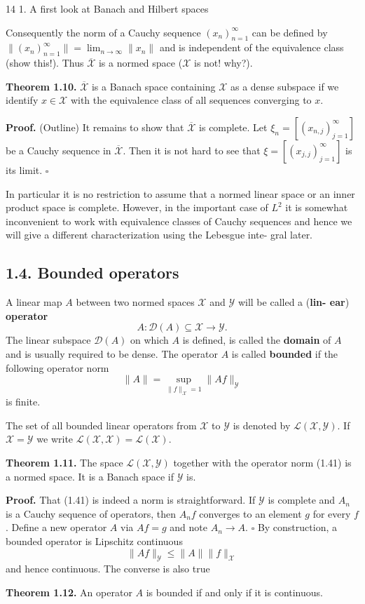 14 \hfill 1. A first look at Banach and Hilbert spaces

Consequently the norm of a Cauchy sequence $(x_n)_{n=1}^\infty$ can be defined by
$\|(x_n)_{n=1}^\infty\| = \lim_{n\to\infty} \|x_n\|$ and is independent of the equivalence class (show
this!). Thus $\overline{\mathcal{X}}$ is a normed space ($\mathcal{X}$ is not! why?).

\noindent\textbf{Theorem 1.10.} $\overline{\mathcal{X}}$ is a Banach space containing $\mathcal{X}$ as a dense subspace if
we identify $x \in \mathcal{X}$ with the equivalence class of all sequences converging to
$x$.

\noindent\textbf{Proof.} (Outline) It remains to show that $\overline{\mathcal{X}}$ is complete. Let $\xi_n = [(x_{n,j})_{j=1}^\infty]$
be a Cauchy sequence in $\overline{\mathcal{X}}$. Then it is not hard to see that $\xi = [(x_{j,j})_{j=1}^\infty]$
is its limit. $\square$

In particular it is no restriction to assume that a normed linear space or
an inner product space is complete. However, in the important case of $L^2$ it is
somewhat inconvenient to work with equivalence classes of Cauchy sequences
and hence we will give a different characterization using the Lebesgue inte-
gral later.

\subsection*{1.4. Bounded operators}

A linear map $A$ between two normed spaces $\mathcal{X}$ and $\mathcal{Y}$ will be called a (\textbf{lin-
ear}) \textbf{operator}
\[
A : \mathcal{D}(A) \subseteq \mathcal{X} \to \mathcal{Y}.
\tag{1.40}
\]
The linear subspace $\mathcal{D}(A)$ on which $A$ is defined, is called the \textbf{domain} of $A$
and is usually required to be dense. The operator $A$ is called \textbf{bounded} if
the following operator norm
\[
\|A\| = \sup_{\|f\|_{\mathcal{X}}=1} \|Af\|_{\mathcal{Y}}
\tag{1.41}
\]
is finite.

The set of all bounded linear operators from $\mathcal{X}$ to $\mathcal{Y}$ is denoted by
$\mathcal{L}(\mathcal{X},\mathcal{Y})$. If $\mathcal{X} = \mathcal{Y}$ we write $\mathcal{L}(\mathcal{X}, \mathcal{X}) = \mathcal{L}(\mathcal{X})$.

\noindent\textbf{Theorem 1.11.} The space $\mathcal{L}(\mathcal{X}, \mathcal{Y})$ together with the operator norm (1.41)
is a normed space. It is a Banach space if $\mathcal{Y}$ is.

\noindent\textbf{Proof.} That (1.41) is indeed a norm is straightforward. If $\mathcal{Y}$ is complete
and $A_n$ is a Cauchy sequence of operators, then $A_n f$ converges to an element
$g$ for every $f$. Define a new operator $A$ via $Af = g$ and note $A_n \to A$. $\square$
By construction, a bounded operator is Lipschitz continuous
\[
\|Af\|_{\mathcal{Y}} \leq \|A\|\| f \|_{\mathcal{X}}
\tag{1.42}
\]
and hence continuous. The converse is also true

\noindent\textbf{Theorem 1.12.} An operator $A$ is bounded if and only if it is continuous.